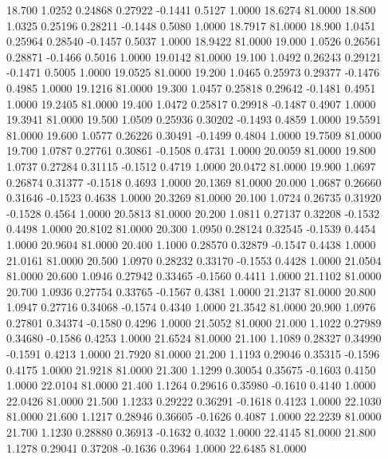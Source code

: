   18.700   1.0252   0.24868   0.27922  -0.1441   0.5127   1.0000  18.6274  81.0000
  18.800   1.0325   0.25196   0.28211  -0.1448   0.5080   1.0000  18.7917  81.0000
  18.900   1.0451   0.25964   0.28540  -0.1457   0.5037   1.0000  18.9422  81.0000
  19.000   1.0526   0.26561   0.28871  -0.1466   0.5016   1.0000  19.0142  81.0000
  19.100   1.0492   0.26243   0.29121  -0.1471   0.5005   1.0000  19.0525  81.0000
  19.200   1.0465   0.25973   0.29377  -0.1476   0.4985   1.0000  19.1216  81.0000
  19.300   1.0457   0.25818   0.29642  -0.1481   0.4951   1.0000  19.2405  81.0000
  19.400   1.0472   0.25817   0.29918  -0.1487   0.4907   1.0000  19.3941  81.0000
  19.500   1.0509   0.25936   0.30202  -0.1493   0.4859   1.0000  19.5591  81.0000
  19.600   1.0577   0.26226   0.30491  -0.1499   0.4804   1.0000  19.7509  81.0000
  19.700   1.0787   0.27761   0.30861  -0.1508   0.4731   1.0000  20.0059  81.0000
  19.800   1.0737   0.27284   0.31115  -0.1512   0.4719   1.0000  20.0472  81.0000
  19.900   1.0697   0.26874   0.31377  -0.1518   0.4693   1.0000  20.1369  81.0000
  20.000   1.0687   0.26660   0.31646  -0.1523   0.4638   1.0000  20.3269  81.0000
  20.100   1.0724   0.26735   0.31920  -0.1528   0.4564   1.0000  20.5813  81.0000
  20.200   1.0811   0.27137   0.32208  -0.1532   0.4498   1.0000  20.8102  81.0000
  20.300   1.0950   0.28124   0.32545  -0.1539   0.4454   1.0000  20.9604  81.0000
  20.400   1.1000   0.28570   0.32879  -0.1547   0.4438   1.0000  21.0161  81.0000
  20.500   1.0970   0.28232   0.33170  -0.1553   0.4428   1.0000  21.0504  81.0000
  20.600   1.0946   0.27942   0.33465  -0.1560   0.4411   1.0000  21.1102  81.0000
  20.700   1.0936   0.27754   0.33765  -0.1567   0.4381   1.0000  21.2137  81.0000
  20.800   1.0947   0.27716   0.34068  -0.1574   0.4340   1.0000  21.3542  81.0000
  20.900   1.0976   0.27801   0.34374  -0.1580   0.4296   1.0000  21.5052  81.0000
  21.000   1.1022   0.27989   0.34680  -0.1586   0.4253   1.0000  21.6524  81.0000
  21.100   1.1089   0.28327   0.34990  -0.1591   0.4213   1.0000  21.7920  81.0000
  21.200   1.1193   0.29046   0.35315  -0.1596   0.4175   1.0000  21.9218  81.0000
  21.300   1.1299   0.30054   0.35675  -0.1603   0.4150   1.0000  22.0104  81.0000
  21.400   1.1264   0.29616   0.35980  -0.1610   0.4140   1.0000  22.0426  81.0000
  21.500   1.1233   0.29222   0.36291  -0.1618   0.4123   1.0000  22.1030  81.0000
  21.600   1.1217   0.28946   0.36605  -0.1626   0.4087   1.0000  22.2239  81.0000
  21.700   1.1230   0.28880   0.36913  -0.1632   0.4032   1.0000  22.4145  81.0000
  21.800   1.1278   0.29041   0.37208  -0.1636   0.3964   1.0000  22.6485  81.0000
